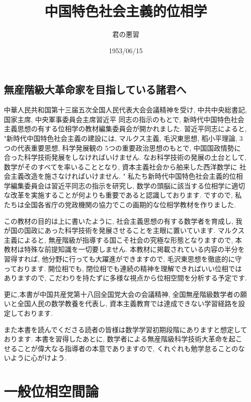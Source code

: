 \documentclass[dvipdfmx]{jbook}
\theoremstyle{remark}
\theoremstyle{plain}
\begin{document}
\title{中国特色社会主義的位相学}
\author{君の悪習}
\date{1953/06/15}
\maketitle
\chapter*{無産階級大革命家を目指している諸君へ}
中華人民共和国第十三届五次全国人民代表大会会議精神を受け, 中共中央総書記, 国家主席, 中央軍事委員会主席習近平
同志の指示のもとで, 新時代中国特色社会主義思想の有する位相学の教材編集委員会が開かれました.
習近平同志によると, "新時代中国特色社会主義の建設には, マルクス主義, 毛沢東思想, 稻小平理論, 3つの代表重要思想, 科学発展観の
5つの重要政治思想のもとで, 
中国国政情勢に合った科学技術発展をしなければいけません. 
なお科学技術の発展の土台として, 数学がそのすべてを率いることとなり, 資本主義社会から舶来した西洋数学に
社会主義改造を施さなければいけません. " 
私たち新時代中国特色社会主義的位相学編集委員会は習近平同志の指示を研究し, 数学の頭脳に該当する位相学に適切な改革を実施することが何よりも重要であると認識しております. ですので, 私たちは全国各省庁の党政機関の協力でこの画期的な位相学教材を作りました. 

この教材の目的は上に書いたように, 社会主義思想の有する数学者を育成し, 我が国の国政にあった科学技術を発展させることを主眼に置いています. 
マルクス主義によると, 無産階級が指導する国こそ社会の究極な形態となりますので, 本教材は特殊な前提知識を一切要しません.
本教材に掲載されている内容の半分を習得すれば, 他分野に行っても大躍進ができますので, 毛沢東思想を徹底的に守っております.
開位相でも, 閉位相でも連続の精神を理解できればいい位相ではありますので, こだわりを持たずに多様な視点から位相空間を分析する予定です.

更に,本書が中国共産党第十八回全国党大会の会議精神, 全国無産階級数学者の願いと全国人民の数学教養を代表し, 資本主義教育では達成できない学習経路を設定しております. 

また本書を読んでくださる読者の皆様は数学学習初期段階にありますと想定しております. 本書を習得したあとに, 数学者による無産階級科学技術大革命を起こせることが偉大なる指導者の本意でありますので, くれぐれも勉学怠ることのないように心がけよう. 
\newpage

\tableofcontents
{}



\part{一般位相空間論}
\end{document}
